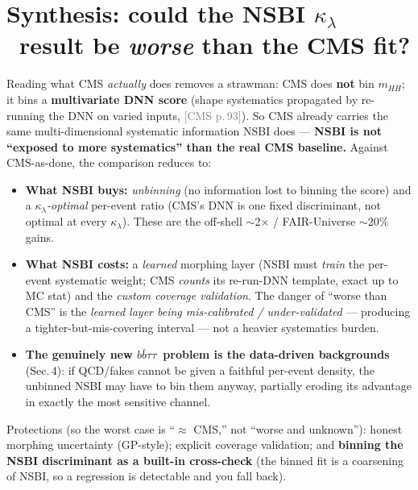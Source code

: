 \documentclass[11pt]{article}
\newcommand{\kl}{\ensuremath{\kappa_\lambda}}
\newcommand{\mhh}{\ensuremath{m_{HH}}}
\newcommand{\bbtt}{\ensuremath{b\bar b\tau\tau}}
\newcommand{\pC}[1]{\textcolor{gray}{\small[CMS p.\,#1]}}
\begin{document}
\section{Synthesis: could the NSBI \kl\ result be \emph{worse} than the CMS fit?}
Reading what CMS \emph{actually} does removes a strawman: CMS does \textbf{not} bin \mhh; it bins a
\textbf{multivariate DNN score} (shape systematics propagated by re-running the DNN on varied inputs, \pC{93}). So
CMS already carries the same multi-dimensional systematic information NSBI does --- \textbf{NSBI is not ``exposed to
more systematics'' than the real CMS baseline.} Against CMS-as-done, the comparison reduces to:
\begin{itemize}
\item \textbf{What NSBI buys:} \emph{unbinning} (no information lost to binning the score) and a \emph{\kl-optimal}
  per-event ratio (CMS's DNN is one fixed discriminant, not optimal at every \kl). These are the off-shell
  $\sim$2$\times$ / FAIR-Universe $\sim$20\% gains.
\item \textbf{What NSBI costs:} a \emph{learned} morphing layer (NSBI must \emph{train} the per-event systematic
  weight; CMS \emph{counts} its re-run-DNN template, exact up to MC stat) and the \emph{custom coverage
  validation}. The danger of ``worse than CMS'' is the \emph{learned layer being mis-calibrated / under-validated}
  --- producing a tighter-but-mis-covering interval --- not a heavier systematics burden.
\item \textbf{The genuinely new \bbtt\ problem is the data-driven backgrounds} (Sec.\,4): if QCD/fakes cannot be
  given a faithful per-event density, the unbinned NSBI may have to bin them anyway, partially eroding its
  advantage in exactly the most sensitive channel.
\end{itemize}
Protections (so the worst case is ``$\approx$ CMS,'' not ``worse and unknown''): honest morphing uncertainty
(GP-style); explicit coverage validation; and \textbf{binning the NSBI discriminant as a built-in cross-check}
(the binned fit is a coarsening of NSBI, so a regression is detectable and you fall back).
\end{document}
